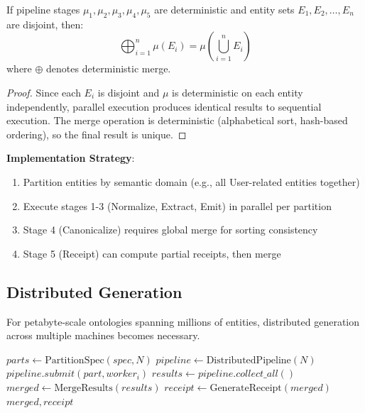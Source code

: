 \begin{theorem}
    If pipeline stages $\mu_1, \mu_2, \mu_3, \mu_4, \mu_5$ are deterministic and entity sets $E_1, E_2, \ldots, E_n$ are disjoint, then:
    \begin{equation}
        \bigoplus_{i=1}^{n} \mu(E_i) = \mu\left(\bigcup_{i=1}^{n} E_i\right)
    \end{equation}
    where $\oplus$ denotes deterministic merge.
\end{theorem}

\begin{proof}
    Since each $E_i$ is disjoint and $\mu$ is deterministic on each entity independently, parallel execution produces identical results to sequential execution. The merge operation is deterministic (alphabetical sort, hash-based ordering), so the final result is unique.
\end{proof}

\textbf{Implementation Strategy}:
\begin{enumerate}
    \item Partition entities by semantic domain (e.g., all User-related entities together)
    \item Execute stages 1-3 (Normalize, Extract, Emit) in parallel per partition
    \item Stage 4 (Canonicalize) requires global merge for sorting consistency
    \item Stage 5 (Receipt) can compute partial receipts, then merge
\end{enumerate}

\subsection{Distributed Generation}

For petabyte-scale ontologies spanning millions of entities, distributed generation across multiple machines becomes necessary.

\begin{algorithm}
\caption{Distributed Pipeline Execution}
\begin{algorithmic}[1]
    \State $parts \gets \text{PartitionSpec}(spec, N)$ 
    \State $pipeline \gets \text{DistributedPipeline}(N)$
        \State $pipeline.submit(part, worker_i)$
    \EndFor
    \State $results \gets pipeline.collect\_all()$
    \State $merged \gets \text{MergeResults}(results)$ 
    \State $receipt \gets \text{GenerateReceipt}(merged)$
    \State \Return $merged, receipt$
\EndProcedure
\end{algorithmic}
\end{algorithm}

